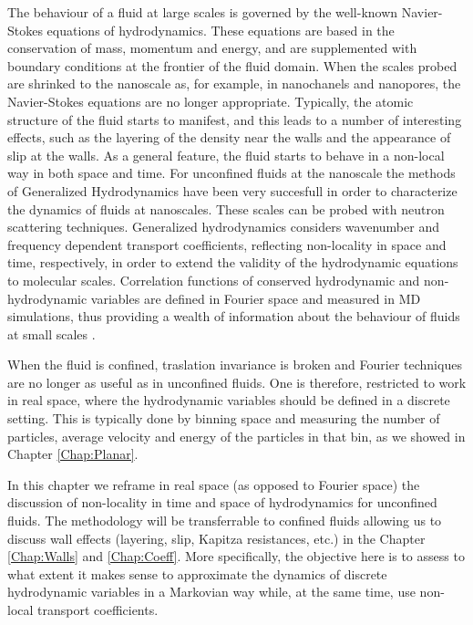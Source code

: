 \documentclass[a4paper,openright,12pt]{book}
\begin{document}
The behaviour of a fluid at large scales is governed by the well-known
Navier-Stokes equations of hydrodynamics. These equations are based in the conservation of mass, momentum and energy, and are supplemented with
boundary conditions  at the  frontier of the  fluid domain.   When the
scales  probed are  shrinked  to  the nanoscale  as,  for example,  in
nanochanels and  nanopores, the Navier-Stokes equations  are no longer
appropriate. Typically,  the atomic structure  of the fluid  starts to
manifest, and this  leads to a number of interesting  effects, such as
the layering of the density near  the walls and the appearance of slip
at the walls.  As a general feature,  the fluid starts to  behave in a
non-local way  in both space and  time.  For unconfined fluids  at the
nanoscale the methods of Generalized Hydrodynamics \cite{Mountain1977,
 Hansen2013,Alley1984}  have been very succesfull  in order
to  characterize the  dynamics of  fluids  at nanoscales. These scales can  be
probed with neutron scattering techniques.  Generalized hydrodynamics
considers wavenumber  and frequency dependent  transport coefficients,
reflecting non-locality in  space and time, respectively,  in order to
extend the validity of the hydrodynamic equations to molecular scales.
Correlation functions of conserved hydrodynamic  and non-hydrodynamic
variables are defined in Fourier space and measured in MD simulations,
thus providing a  wealth of information about the  behaviour of fluids
at small scales \cite{Chung1969,DeSchepper1988,Khayat1989}.

When  the  fluid is  confined,  traslation  invariance is  broken  and
Fourier  techniques  are   no  longer  as  useful   as  in  unconfined
fluids. One is therefore, restricted to  work in real space, where the
hydrodynamic variables should  be defined in a  discrete setting. This
is  typically  done by  binning  space  and  measuring the  number  of
particles, average velocity  and energy of the particles  in that bin, as we showed in Chapter \ref{Chap:Planar}.

In this chapter we reframe in  real space (as opposed
to Fourier space) the discussion of  non-locality in time and space of
hydrodynamics for unconfined fluids. The  methodology will be  transferrable to
confined fluids allowing  us to discuss wall  effects (layering, slip,
Kapitza  resistances, etc.)   in the Chapter \ref{Chap:Walls} and \ref{Chap:Coeff}.  More  specifically, the
objective  here  is  to  assess  to what  extent  it  makes  sense  to
approximate  the  dynamics of  discrete  hydrodynamic  variables in  a
Markovian  way  while,  at  the same  time,  use  non-local  transport
coefficients. 
\end{document}
